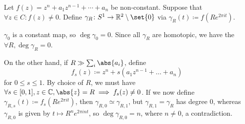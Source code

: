 Let $f(z) = z^n + a_1z^{n-1} + \cdots + a_n$ be non-constant.
Suppose that $\forall z \in C\colon f(z)\neq 0$. Define $\gamma_R\colon S^1\to \mathbb{R}^2\setminus\set{0}$
via $\gamma_R(t)\coloneqq f(Re^{2\pi it})$.

$\gamma_0$ is a constant map, so $\deg\gamma_0=0$. Since all $\gamma_R$ are homotopic,
we have the $\forall R, \deg\gamma_R = 0$.

On the other hand, if $R \gg \sum_i\abs{a_i}$, define
\[ f_s(z)\coloneqq z^n + s(a_1z^{n-1} + \ldots + a_n) \]
for $0\leq s\leq 1$. By choice of $R$, we must have
$\forall s \in [0, 1], z \in \mathbb{C}, \abs{z} = R \implies f_s(z) \neq 0$.
If we now define $\gamma_{R, s}(t)\coloneqq f_s(Re^{2\pi it})$, then
$\gamma_{R, 0}\simeq\gamma_{R, 1}$, but $\gamma_{R, 1} = \gamma_R$ has degree
$0$, whereas $\gamma_{R, 0}$ is given by $t\mapsto R^ne^{2\pi int}$, so
$\deg\gamma_{R, 0}=n$, where $n\neq 0$, a contradiction.
